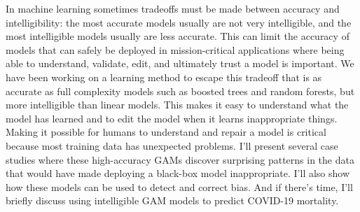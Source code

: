 In machine learning sometimes tradeoffs must be made between accuracy and intelligibility:
the most accurate models usually are not very intelligible, and the most intelligible models usually are
less accurate. This can limit the accuracy of models that can safely be deployed in mission-critical
applications where being able to understand, validate, edit, and ultimately trust a model is important.
We have been working on a learning method to escape this tradeoff that is as accurate as full complexity
models such as boosted trees and random forests, but more intelligible than linear models. This makes it
easy to understand what the model has learned and to edit the model when it learns inappropriate things.
Making it possible for humans to understand and repair a model is critical because most training data
has unexpected problems. I’ll present several case studies where these high-accuracy GAMs discover
surprising patterns in the data that would have made deploying a black-box model inappropriate. I’ll
also show how these models can be used to detect and correct bias. And if there’s time, I’ll briefly
discuss using intelligible GAM models to predict COVID-19 mortality.
